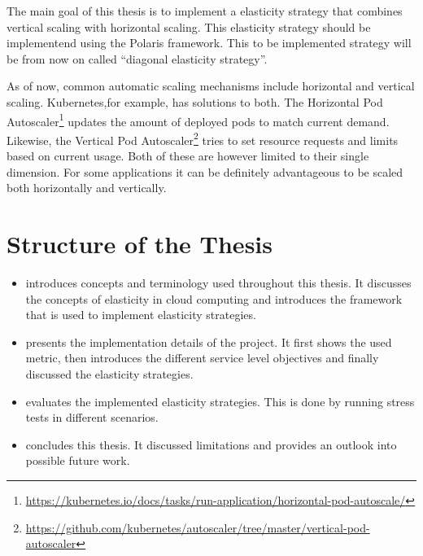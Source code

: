 The main goal of this thesis is to implement a elasticity strategy that combines vertical scaling with horizontal scaling. This elasticity strategy should be implementend using the Polaris framework. This to be implemented strategy will be from now on called ``diagonal elasticity strategy''.

As of now, common automatic scaling mechanisms include horizontal and vertical scaling. Kubernetes,for example, has solutions to both. The Horizontal Pod Autoscaler\footnote{\raggedright\url{https://kubernetes.io/docs/tasks/run-application/horizontal-pod-autoscale/}} updates the amount of deployed pods to match current demand. Likewise, the Vertical Pod Autoscaler\footnote{\raggedright\url{https://github.com/kubernetes/autoscaler/tree/master/vertical-pod-autoscaler}} tries to set resource requests and limits based on current usage. Both of these are however limited to their single dimension. For some applications it can be definitely advantageous to be scaled both horizontally and vertically.

\section{Structure of the Thesis}
\label{sec:structure}

\begin{itemize}
    \item {} introduces concepts and terminology used throughout this thesis. It discusses the concepts of elasticity in cloud computing and introduces the framework that is used to implement elasticity strategies.

    \item {} presents the implementation details of the project. It first shows the used metric, then introduces the different service level objectives and finally discussed the elasticity strategies.

    \item {} evaluates the implemented elasticity strategies. This is done by running stress tests in different scenarios.

    \item {} concludes this thesis. It discussed limitations and provides an outlook into possible future work.
\end{itemize}
